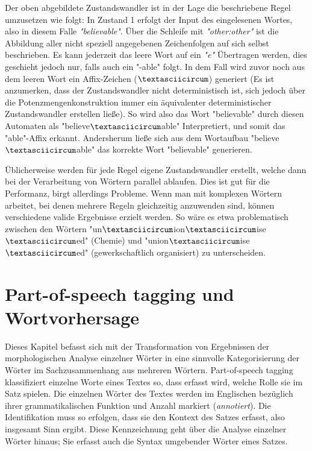\documentclass[12pt]{report}
\begin{document}
Der oben abgebildete Zustandswandler ist in der Lage die beschriebene Regel umzusetzen wie folgt: In Zustand 1 erfolgt der Input des eingelesenen Wortes, also in diesem Falle \textit{"believable"}. Über die Schleife mit \textit{"other:other"} ist die Abbildung aller nicht speziell angegebenen Zeichenfolgen auf sich selbst beschrieben. Es kann jederzeit das leere Wort auf ein \textit{"e"} Übertragen werden, dies geschieht jedoch nur, falls auch ein "-able" folgt. In dem Fall wird zuvor noch aus dem leeren Wort ein Affix-Zeichen ($\textasciicircum$) generiert (Es ist anzumerken, dass der Zustandswandler nicht deterministisch ist, sich jedoch über die Potenzmengenkonstruktion immer ein äquivalenter deterministischer Zustandswandler erstellen ließe). So wird also das Wort "believable" durch diesen Automaten als "believe$\textasciicircum$able" Interpretiert, und somit das "able"-Affix erkannt. Andersherum ließe sich aus dem Wortaufbau "believe$\textasciicircum$able" das korrekte Wort "believable" generieren.

Üblicherweise werden für jede Regel eigene Zustandswandler erstellt, welche dann bei der Verarbeitung von Wörtern parallel ablaufen. Dies ist gut für die Performanz, birgt allerdings Probleme. Wenn man mit komplexen Wörtern arbeitet, bei denen mehrere Regeln gleichzeitig anzuwenden sind, können verschiedene valide Ergebnisse erzielt werden. So wäre es etwa problematisch zwischen den Wörtern "un$\textasciicircum$ion$\textasciicircum$ise$\textasciicircum$ed" (Chemie) und "union$\textasciicircum$ise$\textasciicircum$ed" (gewerkschaftlich organisiert) zu unterscheiden. 

\section{Part-of-speech tagging und Wortvorhersage}
Dieses Kapitel befasst sich mit der Transformation von Ergebnissen der morphologischen Analyse einzelner Wörter in eine sinnvolle Kategorisierung der Wörter im Sachzusammenhang aus mehreren Wörtern. Part-of-speech tagging klassifiziert einzelne Worte eines Textes so, dass erfasst wird, welche Rolle sie im Satz spielen. Die einzelnen Wörter des Textes werden im Englischen bezüglich ihrer grammatikalischen Funktion und Anzahl markiert (\textit{annotiert}). Die Identifikation muss so erfolgen, dass sie den Kontext des Satzes erfasst, also insgesamt Sinn ergibt. Diese Kennzeichnung geht über die Analyse einzelner Wörter hinaus; Sie erfasst auch die Syntax umgebender Wörter eines Satzes. 
\end{document}
